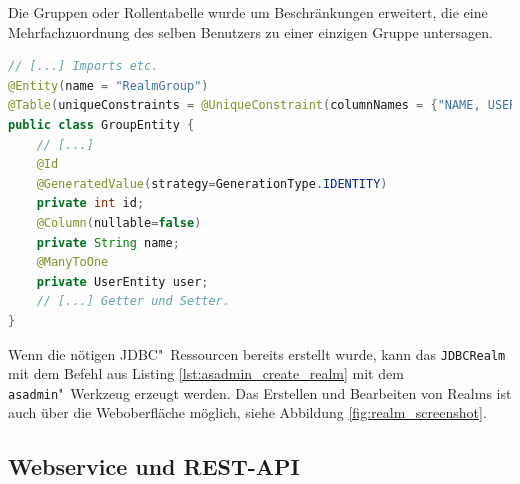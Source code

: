 Die Gruppen oder Rollentabelle wurde um Beschränkungen erweitert, die eine Mehrfachzuordnung des selben Benutzers zu einer einzigen Gruppe untersagen.
\begin{lstlisting}[language=Java,caption={Auszug aus der GroupEntity Klasse.}, label=lst:jdbcrealm_klasse_gruppe_code]
// [...] Imports etc.
@Entity(name = "RealmGroup")
@Table(uniqueConstraints = @UniqueConstraint(columnNames = {"NAME, USER_ID"}))
public class GroupEntity {
    // [...]
    @Id
    @GeneratedValue(strategy=GenerationType.IDENTITY)
    private int id;
    @Column(nullable=false)
    private String name;
    @ManyToOne
    private UserEntity user;
    // [...] Getter und Setter.
}
\end{lstlisting}

Wenn die nötigen \ac{JDBC}"~Ressourcen bereits erstellt wurde, kann das \texttt{JDBCRealm} mit dem Befehl aus Listing \ref{lst:asadmin_create_realm} mit dem \texttt{asadmin}"~Werkzeug erzeugt werden.
Das Erstellen und Bearbeiten von Realms ist auch über die Weboberfläche möglich, siehe Abbildung \ref{fig:realm_screenshot}.

\subsection{Webservice und REST-API}


